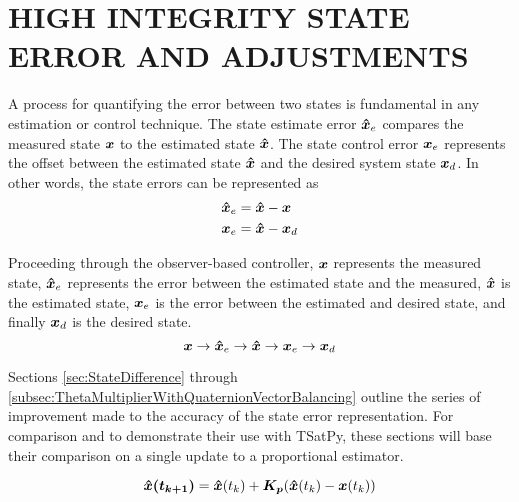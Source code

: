 
\chapter{HIGH INTEGRITY STATE ERROR AND ADJUSTMENTS}
\label{chap:StateError}

A process for quantifying the error between two states is fundamental in any estimation or control technique.  The state estimate error $\boldsymbol{\hat{x}}_e$ compares the measured state $\boldsymbol{x}$ to the estimated state $\boldsymbol{\hat{x}}$.  The state control error $\boldsymbol{x}_e$ represents the offset between the estimated state $\boldsymbol{\hat{x}}$ and the desired system state $\boldsymbol{x}_d$.  In other words, the state errors can be represented as
\begin{subequations}
  \begin{align}
    \boldsymbol{\hat{x}}_e &= \boldsymbol{\hat{x}} - \boldsymbol{x} \\
    \boldsymbol{x}_e &= \boldsymbol{\hat{x}} - \boldsymbol{x}_d
  \end{align}
  \label{eqn:StateError}
\end{subequations}

Proceeding through the observer-based controller, $\boldsymbol{x}$ represents the measured state, $\boldsymbol{\hat{x}}_e$ represents the error between the estimated state and the measured, $\boldsymbol{\hat{x}}$ is the estimated state, $\boldsymbol{x}_e$ is the error between the estimated and desired state, and finally $\boldsymbol{x}_d$ is the desired state.
\begin{equation}
  \boldsymbol{x} \to \boldsymbol{\hat{x}}_e \to \boldsymbol{\hat{x}} \to \boldsymbol{x}_e \to \boldsymbol{x}_d
\end{equation}

Sections \ref{sec:StateDifference} through \ref{subsec:ThetaMultiplierWithQuaternionVectorBalancing} outline the series of improvement made to the accuracy of the state error representation.  For comparison and to demonstrate their use with TSatPy, these sections will base their comparison on a single update to a proportional estimator.

\begin{equation}
  \boldsymbol{\hat{x}(t_{k+1})} = \boldsymbol{\hat{x}}(t_{k}) + \boldsymbol{K_p} ( \boldsymbol{\hat{x}}(t_{k}) - \boldsymbol{x}(t_{k}) )
  \label{eqn:PEstimatorStateDiff}
\end{equation}


